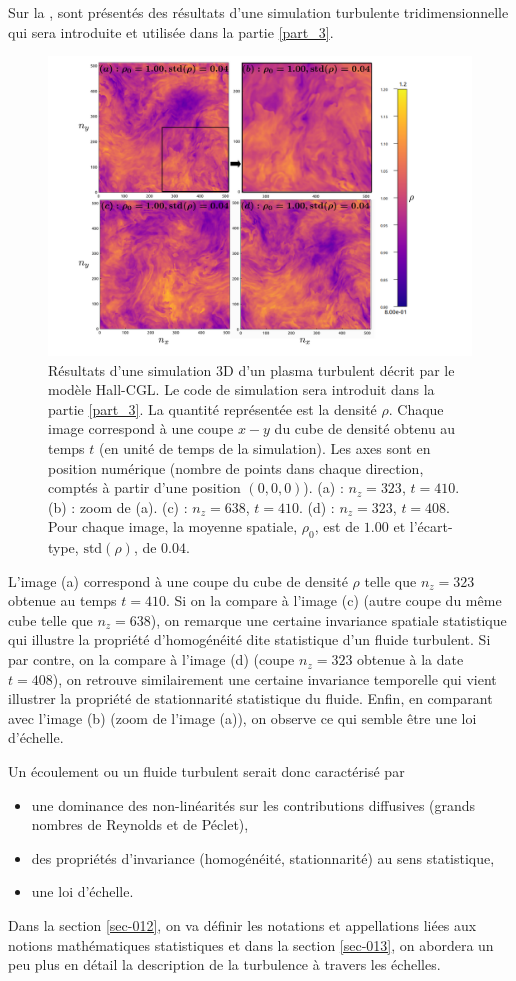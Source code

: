 Sur la , sont présentés des résultats d'une simulation turbulente tridimensionnelle qui sera introduite et utilisée dans la partie \ref{part_3}.
\begin{figure}[!ht]
 \centering
\includegraphics[width=0.8\linewidth,trim=2cm 0cm 4cm 0cm, clip=true]{./Part_0/images/simu_panel_rho}
\cprotect\caption{Résultats d'une simulation \acs{3D} d'un plasma turbulent décrit par le modèle Hall-CGL. Le code de simulation sera introduit dans la partie \ref{part_3}. La quantité représentée est la densité $\rho$. Chaque image correspond à une coupe $x-y$ du cube de densité obtenu au temps $t$ (en unité de temps de la simulation). Les axes sont en position numérique (nombre de points dans chaque direction, comptés à partir d'une position $(0,0,0)$). (a) : $n_z=323$, $t=410$. (b) : zoom de (a). (c) : $n_z=638$, $t=410$. (d) : $n_z=323$, $t=408$. Pour chaque image, la moyenne spatiale, $\rho_0$, est de $\num{1.00}$ et l'écart-type, $\text{std}(\rho)$, de $\num{0.04}$.}
\label{fig:comp_turbul}
\end{figure}
L'image (a) correspond à une coupe du cube de densité $\rho$ telle que $n_z=323$ obtenue au temps $t=410$. Si on la compare à l'image (c) (autre coupe du même cube telle que $n_z=638$), on remarque une certaine invariance spatiale statistique qui illustre la propriété d'homogénéité dite statistique d'un fluide turbulent. Si par contre, on la compare à l'image (d) (coupe $n_z=323$ obtenue à la date $t=408$), on retrouve similairement une certaine invariance temporelle qui vient illustrer la propriété de stationnarité statistique du fluide. Enfin, en comparant avec l'image (b) (zoom de l'image (a)), on observe ce qui semble être une loi d'échelle.

Un écoulement ou un fluide turbulent serait donc caractérisé par
\begin{itemize}
\item une dominance des non-linéarités sur les contributions diffusives (grands nombres de Reynolds et de Péclet),
\item des propriétés d'invariance (homogénéité, stationnarité) au sens statistique,
\item une loi d'échelle.
\end{itemize}
Dans la section \ref{sec-012}, on va définir les notations et appellations liées aux notions mathématiques statistiques et dans la section \ref{sec-013}, on abordera un peu plus en détail la description de la turbulence à travers les échelles.

